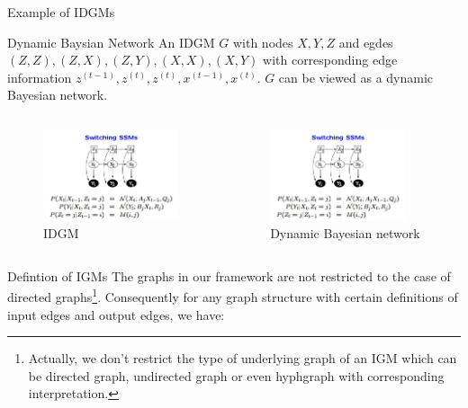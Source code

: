 \documentclass[10pt]{beamer}
\begin{document}
\begin{CJK*}{UTF8}{gbsn}
\begin{frame}{Example of IDGMs}
    \begin{exampleblock}{Dynamic Baysian Network}
        An IDGM $G$ with nodes $X, Y, Z$ and egdes $(Z, Z), (Z, X), (Z, Y), (X, X), (X, Y)$ with corresponding edge information $z^{(t-1)}, z^{(t)}, z^{(t)}, x^{(t-1)}, x^{(t)}$. $G$ can be viewed as a dynamic Bayesian network.
    \end{exampleblock}
    \begin{columns}[T,onlytextwidth]
        \begin{figure}
            \centering
            \includegraphics[width=4cm]{latex/image/dbn.jpg}
            \caption{IDGM}
            \label{fig:my_label}
        \end{figure}
        \begin{figure}
            \centering
            \includegraphics[width=4cm]{latex/image/dbn.jpg}
            \caption{Dynamic Bayesian network}
            \label{fig:dbn}
        \end{figure}
    \end{columns}
    
\end{frame}


\begin{frame}{Defintion of IGMs}
    The graphs in our framework are not restricted to the case of directed graphs\footnote{Actually, we don't restrict the type of underlying graph of an IGM which can be directed graph, undirected graph or even hyphgraph with corresponding interpretation.}. Consequently for any graph structure with certain definitions of input edges and output edges, we have:


\end{frame}
\end{CJK*}
\end{document}
